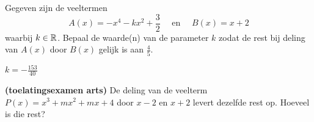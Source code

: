 \documentclass{ximera}
\begin{document}
	\author{Koen De Naeghel - Wiskunde Op Maat}
    \xmsource
	\label{xim:veeltermen_deling_door_xa_oefeningen_reeks2}


\begin{exercise}
Gegeven zijn de veeltermen
\[
A(x) = -x^4 - kx^2+\frac{3}{2} \quad \text{ en } \quad B(x) = x+2
\]
waarbij $k \in \mathbb{R}$. Bepaal de waarde(n) van de parameter $k$ zodat de rest bij deling van $A(x)$ door $B(x)$ gelijk is aan $\frac{4}{5}$. 
\begin{uitkomst} \( k = - \frac{153}{40} \) \end{uitkomst} 
\end{exercise}

\begin{exercise}
{\bf (toelatingsexamen arts)} 
De deling van de veelterm $P(x) = x^3 + mx^2 + mx + 4$ door $x-2$ en $x+2$ levert dezelfde rest op. Hoeveel is die rest?
\begin{multipleChoice}
\end{multipleChoice}
\end{exercise}
\end{document}
